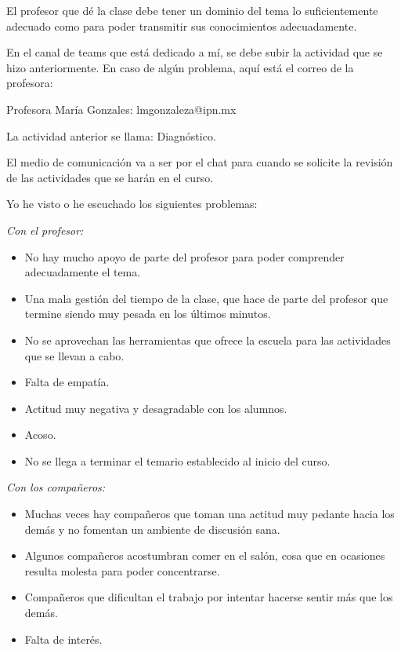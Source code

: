 \documentclass[12pt]{report}
\newcounter{it}
\theoremstyle{largebreak}
\begin{document}
    El profesor que dé la clase debe tener un dominio del tema lo suficientemente adecuado como para poder transmitir sus conocimientos adecuadamente.


    En el canal de teams que está dedicado a mí, se debe subir la actividad que se hizo anteriormente. En caso de algún problema, aquí está el correo de la profesora:

    Profesora María Gonzales: lmgonzaleza@ipn.mx

    La actividad anterior se llama: Diagnóstico.

    El medio de comunicación va a ser por el chat para cuando se solicite la revisión de las actividades que se harán en el curso.


    Yo he visto o he escuchado los siguientes problemas:

    \textit{Con el profesor:}
    
    \begin{itemize}
        \item No hay mucho apoyo de parte del profesor para poder comprender adecuadamente el tema.
        \item Una mala gestión del tiempo de la clase, que hace de parte del profesor que termine siendo muy pesada en los últimos minutos.
        \item No se aprovechan las herramientas que ofrece la escuela para las actividades que se llevan a cabo.
        \item Falta de empatía.
        \item Actitud muy negativa y desagradable con los alumnos.
        \item Acoso.
        \item No se llega a terminar el temario establecido al inicio del curso.
    \end{itemize}

    \textit{Con los compañeros:}

    \begin{itemize}
        \item Muchas veces hay compañeros que toman una actitud muy pedante hacia los demás y no fomentan un ambiente de discusión sana.
        \item Algunos compañeros acostumbran comer en el salón, cosa que en ocasiones resulta molesta para poder concentrarse.
        \item Compañeros que dificultan el trabajo por intentar hacerse sentir más que los demás.
        \item Falta de interés.
    \end{itemize}
\end{document}
